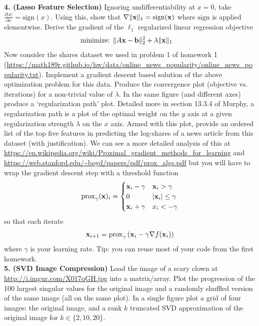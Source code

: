 \documentclass[12pt,letterpaper,fleqn]{hmcpset}
\begin{document}
\vspace{10mm}

\textbf{4. (Lasso Feature Selection)} Ignoring undifferentiability at $x=0$, take $\frac{\partial |x|}{\partial x}
= \mathrm{sign} (x)$. Using this, show that $\nabla \|{\bf x}\|_1 = \mathrm{sign}({\bf x})$ where $\mathrm{sign}$ is applied
elementwise. Derive the gradient of the $\ell_1$ regularized linear regression objective
\begin{align*}
    \text{minimize: } & \|A{\bf x} - {\bf b}\|_2^2 + \lambda \|{\bf x}\|_1
\end{align*}
Now consider the shares dataset we used in problem 1 of homework 1
(\url{https://math189r.github.io/hw/data/online_news_popularity/online_news_popularity.txt}).
Implement a gradient descent based solution of the above optimization problem for this data. Produce
the convergence plot (objective vs. iterations) for a non-trivial value of $\lambda$.
In the same figure (and different axes) produce a `regularization path' plot. Detailed
more in section 13.3.4 of Murphy, a regularization path is a plot of the optimal weight on
the $y$ axis at a given regularization strength $\lambda$ on the $x$ axis. Armed with this
plot, provide an ordered list of the top five features in predicting the log-shares of a news
article from this dataset (with justification). We can see a more detailed analysis of this
at \url{https://en.wikipedia.org/wiki/Proximal_gradient_methods_for_learning} and
\url{https://web.stanford.edu/~boyd/papers/pdf/prox_algs.pdf} but you will have to wrap
the gradient descent step with a threshold function
\[
    \mathrm{prox}_{\gamma}({\bf x})_i = \begin{cases}
        {\bf x}_i - \gamma & {\bf x}_i > \gamma\\
        0 & |{\bf x}_i| \leq \gamma\\
        {\bf x}_i + \gamma & x_i < -\gamma
    \end{cases}
\]
so that each iterate
\[
    {\bf x}_{i+1} = \mathrm{prox}_{\gamma}\left( {\bf x}_i - \gamma \nabla f({\bf x}_i) \right)
\]
where $\gamma$ is your learning rate. Tip: you can reuse most of your code from the
first homework.\\[1em]

\textbf{5. (SVD Image Compression)} Load the image of a scary clown at \url{http://i.imgur.com/X017qGH.jpg}
into a matrix/array. Plot the progression of the 100 largest singular values for the original image
and a randomly shuffled version of the same image (all on the same plot). In a single figure plot
a grid of four images: the original image, and a rank $k$ truncated SVD approximation of the original
image for $k\in\{2,10,20\}$.\\[1em]
\end{document}
